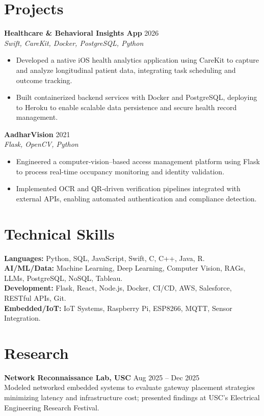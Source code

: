 \documentclass[letterpaper,11pt]{article}
\begin{document}
\section*{Projects}
\textbf{Healthcare \& Behavioral Insights App} \hfill 2026 \\
\textit{Swift, CareKit, Docker, PostgreSQL, Python}
\begin{itemize}
    \item Developed a native iOS health analytics application using CareKit to capture and analyze longitudinal patient data, integrating task scheduling and outcome tracking.
    \item Built containerized backend services with Docker and PostgreSQL, deploying to Heroku to enable scalable data persistence and secure health record management.
\end{itemize}
\textbf{AadharVision} \hfill 2021 \\
\textit{Flask, OpenCV, Python}
\begin{itemize}
    \item Engineered a computer-vision–based access management platform using Flask to process real-time occupancy monitoring and identity validation.
    \item Implemented OCR and QR-driven verification pipelines integrated with external APIs, enabling automated authentication and compliance detection.
\end{itemize}

\section*{Technical Skills}
\textbf{Languages:} Python, SQL, JavaScript, Swift, C, C++, Java, R. \\
\textbf{AI/ML/Data:} Machine Learning, Deep Learning, Computer Vision, RAGs, LLMs, PostgreSQL, NoSQL, Tableau. \\
\textbf{Development:} Flask, React, Node.js, Docker, CI/CD, AWS, Salesforce, RESTful APIs, Git. \\
\textbf{Embedded/IoT:} IoT Systems, Raspberry Pi, ESP8266, MQTT, Sensor Integration.

\section*{Research}
\textbf{Network Reconnaissance Lab, USC} \hfill Aug 2025 -- Dec 2025 \\
Modeled networked embedded systems to evaluate gateway placement strategies minimizing latency and infrastructure cost; presented findings at USC’s Electrical Engineering Research Festival.
\end{document}
